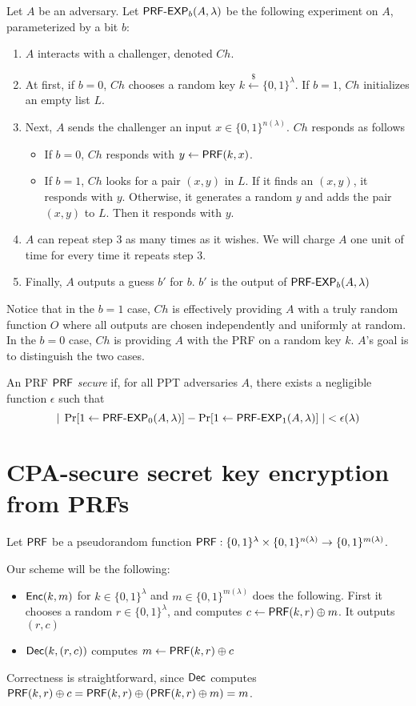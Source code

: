 Let $A$ be an adversary.  Let $\text{\sf PRF-EXP}_b(A,\lambda)$ be the following experiment on $A$, parameterized by a bit $b$:
\begin{enumerate}
	\item $A$ interacts with a challenger, denoted $Ch$.
	\item At first, if $b=0$, $Ch$ chooses a random key $k\stackrel{\$}{\gets}\{0,1\}^\lambda$.  If $b=1$, $Ch$ initializes an empty list $L$.
	\item Next, $A$ sends the challenger an input $x\in\{0,1\}^{n(\lambda)}$.  $Ch$ responds as follows
	\begin{itemize}
		\item If $b=0$, $Ch$ responds with $y\gets{\sf PRF}(k,x)$.
		\item If $b=1$, $Ch$ looks for a pair $(x,y)$ in $L$.  If it finds an $(x,y)$, it responds with $y$.  Otherwise, it generates a random $y$ and adds the pair $(x,y)$ to $L$.  Then it responds with $y$.
	\end{itemize}
	\item $A$ can repeat step 3 as many times as it wishes.  We will charge $A$ one unit of time for every time it repeats step 3.
	\item Finally, $A$ outputs a guess $b'$ for $b$.  $b'$ is the output of $\text{\sf PRF-EXP}_b(A,\lambda)$
\end{enumerate}

Notice that in the $b=1$ case, $Ch$ is effectively providing $A$ with a truly random function $O$ where all outputs are chosen independently and uniformly at random.  In the $b=0$ case, $Ch$ is providing $A$ with the PRF on a random key $k$.  $A$'s goal is to distinguish the two cases.

\begin{definition} An PRF ${\sf PRF}$ \emph{secure} if, for all PPT adversaries $A$, there exists a negligible function $\epsilon$ such that
	\[|\;\Pr[1\gets\text{\sf PRF-EXP}_0(A,\lambda)]-\Pr[1\gets\text{\sf PRF-EXP}_1(A,\lambda)]\;|<\epsilon(\lambda)\]
\end{definition}

\section{CPA-secure secret key encryption from PRFs}

Let ${\sf PRF}$ be a pseudorandom function ${\sf PRF}:\{0,1\}^\lambda\times\{0,1\}^{n(\lambda)}\rightarrow\{0,1\}^{m(\lambda)}$.  

Our scheme will be the following:
\begin{itemize}
	\item ${\sf Enc}(k,m)$ for $k\in\{0,1\}^\lambda$ and $m\in\{0,1\}^{m(\lambda)}$ does the following.  First it chooses a random $r\in\{0,1\}^\lambda$, and computes $c\gets{\sf PRF}(k,r)\oplus m$.  It outputs $(r,c)$
	\item ${\sf Dec}(k,(r,c))$ computes $m\gets{\sf PRF}(k,r)\oplus c$
\end{itemize}
Correctness is straightforward, since ${\sf Dec}$ computes ${\sf PRF}(k,r)\oplus c={\sf PRF}(k,r)\oplus({\sf PRF}(k,r)\oplus m)=m$.

